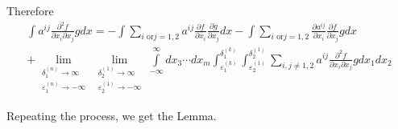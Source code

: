 Therefore\pageoriginale
\begin{multline*}
 \int a^{ij} \frac{\partial^2 f}{\partial x_i \partial x_j} gdx=-
 \int \sum_{i \text{ or} j=1,2} a^{ij} \frac{\partial f}{\partial
  x_i} \frac{\partial g}{\partial x_j}dx
 -\int \sum_{i \text{ or}j=1,2} \frac{\partial a^{ij}}{\partial
  x_i} \frac{\partial f}{\partial x_j}gdx \\
  +\lim\limits_{\substack{\delta^{(n)}_1 \to \infty\\{\varepsilon^{(n)}_1\to
   -\infty}}}\lim\limits_{\substack{\delta_2^{(1)} \to \infty\\{\varepsilon_2^{(1)}\to
   -\infty}}} \int\limits^\infty_{-\infty} dx_3 \cdots dx_m \int
^{\delta^{(k)}_1}_{\varepsilon^{(k)}_1} \int
^{\delta^{(1)}_2}_{\varepsilon^{(1)}_2} \sum_{i,j \neq 1,2} a^{ij}
 \frac{\partial^2 f}{\partial x_i \partial
 x_j}g dx_1dx_2 
\end{multline*}

Repeating the process, we get the Lemma.
